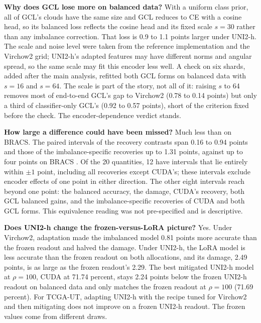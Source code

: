 \textbf{Why does GCL lose more on balanced data?} With a uniform class prior, all of GCL's clouds have the same size and GCL reduces to CE with a cosine head, so its balanced loss reflects the cosine head and its fixed scale $s=30$ rather than any imbalance correction. That loss is 0.9 to 1.1 points larger under UNI2-h. The scale and noise level were taken from the reference implementation and the Virchow2 grid; UNI2-h's adapted features may have different norms and angular spread, so the same scale may fit this encoder less well. A check on six shards, added after the main analysis, refitted both GCL forms on balanced data with $s=16$ and $s=64$. The scale is part of the story, not all of it: raising $s$ to 64 removes most of end-to-end GCL's gap to Virchow2 (0.78 to 0.14 points) but only a third of classifier-only GCL's (0.92 to 0.57 points), short of the criterion fixed before the check. The encoder-dependence verdict stands.

\textbf{How large a difference could have been missed?} Much less than on BRACS. The paired intervals of the recovery contrasts span 0.16 to 0.94 points and those of the imbalance-specific recoveries up to 1.31 points, against up to four points on BRACS \citep{queisler2026mitigationUni2h}. Of the 20 quantities, 12 have intervals that lie entirely within $\pm1$ point, including all recoveries except CUDA's; these intervals exclude encoder effects of one point in either direction. The other eight intervals reach beyond one point: the balanced accuracy, the damage, CUDA's recovery, both GCL balanced gains, and the imbalance-specific recoveries of CUDA and both GCL forms. This equivalence reading was not pre-specified and is descriptive.

\textbf{Does UNI2-h change the frozen-versus-LoRA picture?} Yes. Under Virchow2, adaptation made the imbalanced model 0.81 points more accurate than the frozen readout and halved the damage. Under UNI2-h, the LoRA model is less accurate than the frozen readout on both allocations, and its damage, 2.49 points, is as large as the frozen readout's 2.29. The best mitigated UNI2-h model at $\rho=100$, CUDA at 71.74 percent, stays 2.24 points below the frozen UNI2-h readout on balanced data and only matches the frozen readout at $\rho=100$ (71.69 percent). For TCGA-UT, adapting UNI2-h with the recipe tuned for Virchow2 and then mitigating does not improve on a frozen UNI2-h readout. The frozen values come from different draws.

